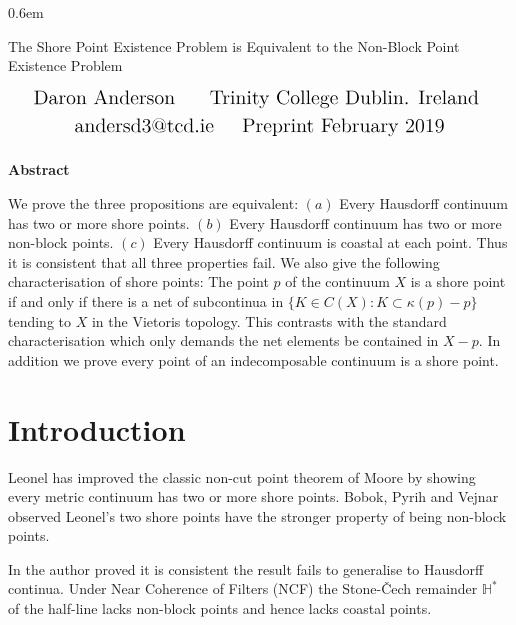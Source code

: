 \documentclass[12pt]{article}
\theoremstyle{plain}
\theoremstyle{definition}
\newcommand{\K}{\ensuremath{\kappa}}
\newcommand{\HH}{\ensuremath{\mathbb H}}
\newcommand{\0}{\ensuremath{\varnothing}}
\begin{document}
 

\openup 0.6em

\fontsize{13}{5}
\selectfont
 
	 
	
	\begin{center}\LARGE The Shore Point Existence Problem is Equivalent to the Non-Block Point Existence Problem
	\end{center}
	
	\begin{align*}
	\text{\Large Daron Anderson }  \qquad \text{\Large Trinity College Dublin. Ireland }  
	\end{align*} 
	\begin{align*} \text{\Large andersd3@tcd.ie} \qquad \text{\Large Preprint February 2019}  
	\end{align*}$ $\\
	
	
	\begin{center}
		\textbf{ \large Abstract}
	\end{center}
	
	\noindent  We prove the three propositions are equivalent:
		$(a)$ Every Hausdorff continuum has two or more shore points.
		$(b)$ Every Hausdorff continuum has two or more non-block points.
		$(c)$ Every Hausdorff continuum is coastal at each point.
		Thus it is consistent that all three properties fail.
		We also give the following characterisation of shore points: The point $p$ of the continuum $X$ is a shore point if and only if there is a net of subcontinua in $\{K \in C(X): K \subset \K(p) - p\}$
		tending to $X$ in the Vietoris topology. This contrasts with the standard characterisation which only demands the net elements be contained in $X-p$.
		In addition we prove every point of an indecomposable continuum is a shore point. 
	 


\section{Introduction}
 

\noindent Leonel \cite{Leonel01} has improved the classic non-cut point theorem of Moore \cite{noncutmoore} 
by showing every metric continuum has two or more shore points.
Bobok, Pyrih and Vejnar \cite{B} observed Leonel's two shore points have the stronger property of being non-block points.

In \cite {Me2} the author proved it is consistent the result fails to generalise to Hausdorff continua.
Under Near Coherence of Filters (NCF) the Stone-\v Cech remainder $\HH^*$ of the half-line lacks non-block points and hence lacks coastal points.
\end{document}
